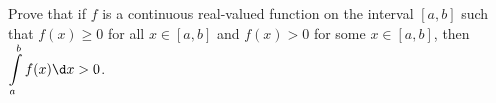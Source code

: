 \begin{problem}
  Prove that if $f$ is a continuous real-valued function on the interval
  $[a, b]$ such that $f(x) \geq 0$ for all $x \in [a, b]$ and
  $f(x) > 0$ for some $x \in [a, b]$, then $\displaystyle \int\limits_a^b f(x) \d x > 0$.
\end{problem}

\begin{answer}

\end{answer}
